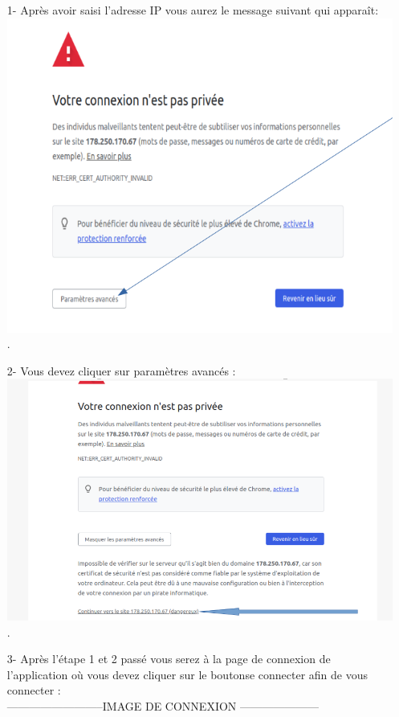 \documentclass[12pt,a4paper]{article}
\begin{document}
\begin{itemize}
\item[1-]Après avoir saisi l'adresse IP vous aurez le message suivant qui apparaît:\\
\includegraphics[scale=0.45]{end/DomaineName.png}.\\
\item[2-]Vous devez cliquer sur paramètres avancés : \\
\includegraphics[scale=0.45]{end/advancedParameter.png}.\\
\item[3-]Après l'étape 1 et 2 passé vous serez à la page de connexion de l'application où vous devez cliquer sur le boutonse connecter afin de vous connecter : \\
--------------------------IMAGE DE CONNEXION ---------------------

\end{itemize}
\end{document}
